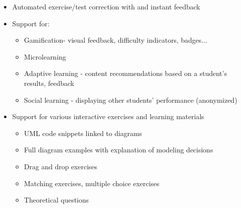 \begin{itemize}
    \item Automated exercise/test correction with and instant feedback
    \item Support for:
        \begin{itemize}
            \item Gamification- visual feedback, difficulty indicators, badges...
            \item Microlearning
            \item Adaptive learning - content recommendations based on a student's results, feedback
            \item Social learning - displaying other students' performance (anonymized)
        \end{itemize}
    \item Support for various interactive exercises and learning materials
        \begin{itemize}
            \item UML code snippets linked to diagrams
            \item Full diagram examples with explanation of modeling decisions
            \item Drag and drop exercises %
            \item Matching exercises, multiple choice exercises
            \item Theoretical questions 
           

\end{itemize}
\end{itemize}
